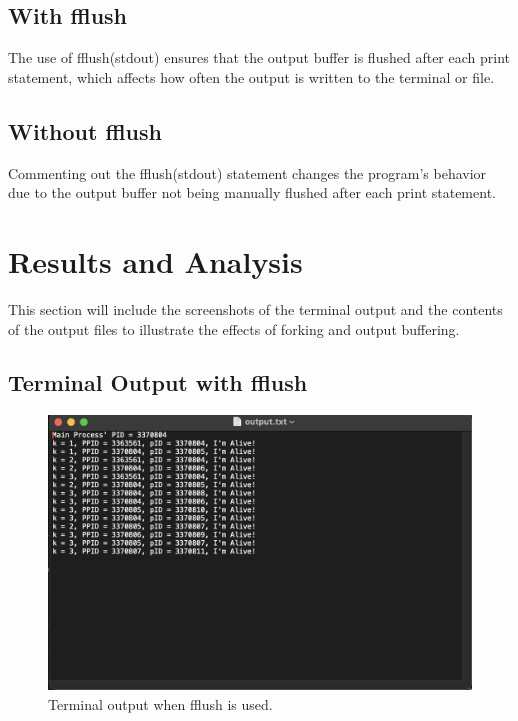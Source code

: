 \documentclass[12pt]{article}
\begin{document}
\newpage
  \subsection{With fflush}
The use of fflush(stdout) ensures that the output buffer is flushed after each print statement, which affects how often the output is written to the terminal or file. 



\subsection{Without fflush}
Commenting out the fflush(stdout) statement changes the program's behavior due to the output buffer not being manually flushed after each print statement.



\newpage
  \section{Results and Analysis}
This section will include the screenshots of the terminal output and the contents of the output files to illustrate the effects of forking and output buffering.

\subsection{Terminal Output with fflush}
\begin{figure}[h]
\centering
\includegraphics[width=\textwidth]{output_with_fflush.png}
\caption{Terminal output when fflush is used.}
\end{figure}
\end{document}
